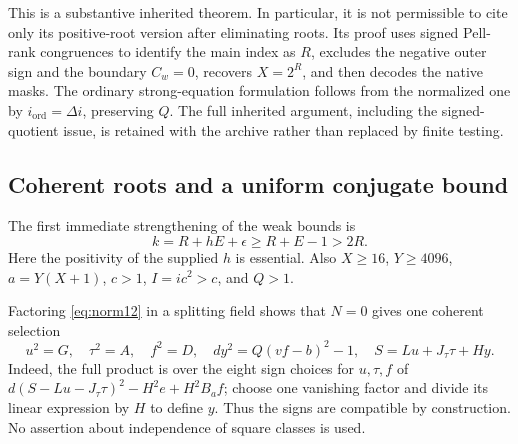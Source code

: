This is a substantive inherited theorem. In particular, it is not permissible
to cite only its positive-root version after eliminating roots. Its proof
uses signed Pell-rank congruences to identify the main index as $R$, excludes
the negative outer sign and the boundary $C_w=0$, recovers $X=2^R$, and then
decodes the native masks. The ordinary strong-equation formulation follows
from the normalized one by $i_{\mathrm{ord}}=\Delta i$, preserving $Q$.
The full inherited argument, including the signed-quotient issue, is retained
with the archive rather than replaced by finite testing.

\subsection{Coherent roots and a uniform conjugate bound}
The first immediate strengthening of the weak bounds is
\begin{equation}
 k=R+hE+\epsilon\ge R+E-1>2R.\label{eq:k2r}
\end{equation}
Here the positivity of the supplied $h$ is essential. Also
$X\ge16$, $Y\ge4096$, $a=Y(X+1)$, $c>1$, $I=ic^2>c$, and $Q>1$.

Factoring \eqref{eq:norm12} in a splitting field shows that $N=0$ gives
one coherent selection
\begin{equation}
 u^2=G,\quad \tau^2=A,\quad f^2=D,\quad
 dy^2=Q(vf-b)^2-1,\quad S=Lu+J_\tau\tau+Hy.
 \label{eq:coherent12}
\end{equation}
Indeed, the full product is over the eight sign choices for $u,\tau,f$ of
$d(S-Lu-J_\tau\tau)^2-H^2e+H^2B_af$; choose one vanishing factor and divide
its linear expression by $H$ to define $y$. Thus the signs are compatible
by construction. No assertion about independence of square classes is used.

